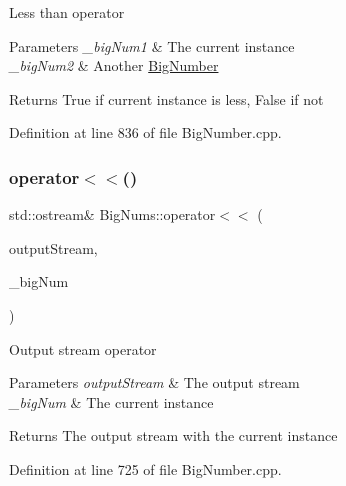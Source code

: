 Less than operator 
\begin{DoxyParams}{Parameters}
{\em \+\_\+big\+Num1} & The current instance \\
\hline
{\em \+\_\+big\+Num2} & Another \mbox{\hyperlink{class_big_nums_1_1_big_number}{Big\+Number}} \\
\hline
\end{DoxyParams}
\begin{DoxyReturn}{Returns}
True if current instance is less, False if not 
\end{DoxyReturn}


Definition at line 836 of file Big\+Number.\+cpp.

\mbox{\label{namespace_big_nums_aa974f80c6eaffabdcb244efbfc8ef40f}} 
\subsubsection{\texorpdfstring{operator$<$$<$()}{operator<<()}\hspace{0.1cm}{\footnotesize\ttfamily [1/2]}}
{\footnotesize\ttfamily std\+::ostream\& Big\+Nums\+::operator$<$$<$ (\begin{DoxyParamCaption}\item[{std\+::ostream \&}]{output\+Stream,  }\item[{const \mbox{\hyperlink{class_big_nums_1_1_big_number}{Big\+Number}} \&}]{\+\_\+big\+Num }\end{DoxyParamCaption})}

Output stream operator 
\begin{DoxyParams}{Parameters}
{\em output\+Stream} & The output stream \\
\hline
{\em \+\_\+big\+Num} & The current instance \\
\hline
\end{DoxyParams}
\begin{DoxyReturn}{Returns}
The output stream with the current instance 
\end{DoxyReturn}


Definition at line 725 of file Big\+Number.\+cpp.

\mbox{\label{namespace_big_nums_a7fae187d94a5f4c3869ca24f68826cef}} 
